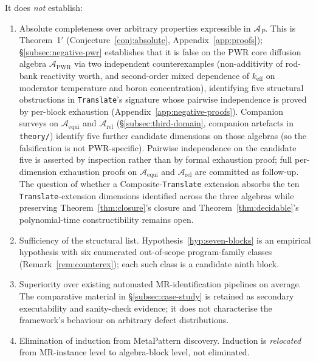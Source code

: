 \documentclass[manuscript]{acmart}
\begin{document}
\begin{tcolorbox}[breakable,colback=gray!5,colframe=black!50,arc=2pt,boxrule=0.5pt,fontupper=\small,title=Boundary of contribution,fonttitle=\small\bfseries]
It does \emph{not} establish:
\begin{enumerate}[leftmargin=*,nosep]
  \item[(a)] Absolute completeness over arbitrary properties expressible in $\mathcal{A}_P$. This is Theorem~1$'$ (Conjecture~\ref{conj:absolute}, Appendix~\ref{app:proofs}); \S\ref{subsec:negative-pwr} establishes that it is false on the PWR core diffusion algebra $\mathcal{A}_{\mathrm{PWR}}$ via two independent counterexamples (non-additivity of rod-bank reactivity worth, and second-order mixed dependence of $k_{\mathrm{eff}}$ on moderator temperature and boron concentration), identifying five structural obstructions in \texttt{Translate}'s signature whose pairwise independence is proved by per-block exhaustion (Appendix~\ref{app:negative-proofs}). Companion surveys on $\mathcal{A}_{\mathrm{equi}}$ and $\mathcal{A}_{\mathrm{rel}}$ (\S\ref{subsec:third-domain}, companion artefacts in \texttt{theory/}) identify five further candidate dimensions on those algebras (so the falsification is not PWR-specific). Pairwise independence on the candidate five is asserted by inspection rather than by formal exhaustion proof; full per-dimension exhaustion proofs on $\mathcal{A}_{\mathrm{equi}}$ and $\mathcal{A}_{\mathrm{rel}}$ are committed as follow-up. The question of whether a Composite-\texttt{Translate} extension absorbs the ten \texttt{Translate}-extension dimensions identified across the three algebras while preserving Theorem~\ref{thm:closure}'s closure and Theorem~\ref{thm:decidable}'s polynomial-time constructibility remains open.
  \item[(b)] Sufficiency of the structural list. Hypothesis~\ref{hyp:seven-blocks} is an empirical hypothesis with six enumerated out-of-scope program-family classes (Remark~\ref{rem:counterex}); each such class is a candidate ninth block.
  \item[(c)] Superiority over existing automated MR-identification pipelines on average. The comparative material in \S\ref{subsec:case-study} is retained as secondary executability and sanity-check evidence; it does not characterise the framework's behaviour on arbitrary defect distributions.
  \item[(d)] Elimination of induction from MetaPattern discovery. Induction is \emph{relocated} from MR-instance level to algebra-block level, not eliminated.
\end{enumerate}
\end{tcolorbox}
\end{document}
